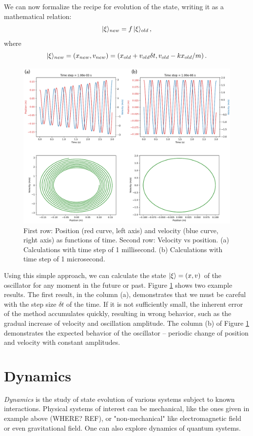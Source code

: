 We can now formalize the recipe for evolution of the state, writing it as a mathematical relation:
\[
|{\xi}\rangle_{new} = f\,|{\xi}\rangle_{old}\,,
\]
where 
\[
|{\xi}\rangle_{new}=(x_{new}, v_{new}) = (x_{old}+v_{old}\delta t, v_{old} - kx_{old}/m)\,.
\]
\begin{figure}[htbp]
	\centering
	\includegraphics[scale=0.65]{newtonianStateEvolution}
	\caption{First row: Position (red curve, left axis) and velocity (blue
		curve, right axis) as functions of time. Second row: Velocity vs position.
		(a) Calculations with time step of 1 millisecond. (b) Calculations
		with time step of 1 microsecond.}
	\label{fig:newtonianStateEvolution}
\end{figure}

Using this simple approach, we can calculate the state $|{\xi}\rangle=(x, v)$ of the
oscillator for any moment in the future or past. Figure
\ref{fig:newtonianStateEvolution} shows two example results. The first
result, in the column (a), demonstrates that we must be careful with
the step size $\delta t$ of the time. If it is not sufficiently small,
the inherent error of the method accumulates quickly, resulting in
wrong behavior, such as the gradual increase of velocity and
oscillation amplitude. The column (b) of Figure
\ref{fig:newtonianStateEvolution} demonstrates the expected behavior
of the oscillator -- periodic change of position and velocity with constant amplitudes.

\section{Dynamics}\label{sec:Dynamics}
\emph{Dynamics} is the study of state evolution of various systems subject to known interactions. 
Physical systems of interest can be mechanical, like the ones given in example above (WHERE? REF), or  "non-mechanical" like electromagnetic field or even gravitational field. One can also explore dynamics of quantum systems.
 
